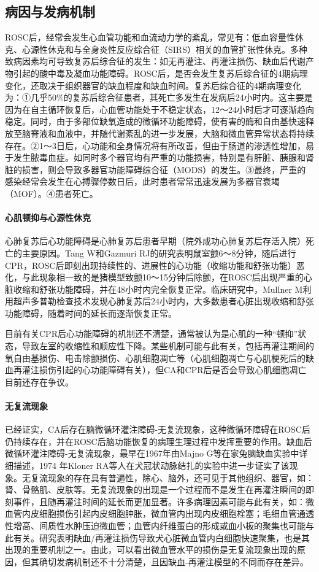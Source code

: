 \subsection{病因与发病机制}

ROSC后，经常会发生心血管功能和血流动力学的紊乱，常见有：低血容量性休克、心源性休克和与全身炎性反应综合征（SIRS）相关的血管扩张性休克。多种致病因素均可导致复苏后综合征的发生：如无再灌注、再灌注损伤、缺血后代谢产物引起的酸中毒及凝血功能障碍。ROSC后，是否会发生复苏后综合征的4期病理变化，还取决于组织器官的缺血程度和缺血时间。复苏后综合征的4期病理变化为：①几乎50\%的复苏后综合征患者，其死亡多发生在发病后24小时内。这主要是因为在自主循环恢复后，心血管功能处于不稳定状态，12～24小时后才可逐渐趋向稳定。同时，由于多部位缺氧造成的微循环功能障碍，使有害的酶和自由基快速释放至脑脊液和血液中，并随代谢紊乱的进一步发展，大脑和微血管异常状态将持续存在。②1～3日后，心功能和全身情况将有所改善，但由于肠道的渗透性增加，易于发生脓毒血症。如同时多个器官均有严重的功能损害，特别是有肝脏、胰腺和肾脏的损害，则会导致多器官功能障碍综合征（MODS）的发生。③最终，严重的感染经常会发生在心搏骤停数日后，此时患者常常迅速发展为多器官衰竭（MOF）。④患者死亡。

\paragraph{心肌顿抑与心源性休克}

心肺复苏后心功能障碍是心肺复苏后患者早期（院外成功心肺复苏后存活入院）死亡的主要原因。Tang
W和Gazmuri
RJ的研究表明鼠室颤6～8分钟，随后进行CPR，ROSC后即刻出现持续性的、进展性的心功能（收缩功能和舒张功能）恶化，与此现象相一致的是猪模型致颤10～15分钟后除颤，在ROSC后出现严重的心脏收缩和舒张功能障碍，并在48小时内完全恢复正常。临床研究中，Mullner
M利用超声多普勒检查技术发现心肺复苏后24小时内，大多数患者心脏出现收缩和舒张功能障碍，随着时间的延长而逐渐恢复正常。

目前有关CPR后心功能障碍的机制还不清楚，通常被认为是心肌的一种“顿抑”状态，导致左室的收缩性和顺应性下降。某些机制可能与此有关，包括再灌注期间的氧自由基损伤、电击除颤损伤、心肌细胞凋亡等（心肌细胞凋亡与心肌梗死后的缺血再灌注损伤引起的心功能障碍有关），但CA和CPR后是否会导致心肌细胞凋亡目前还存在争议。

\paragraph{无复流现象}

已经证实，CA后存在脑微循环灌注障碍-无复流现象，这种微循环障碍在ROSC后仍持续存在，并在ROSC后脑功能恢复的病理生理过程中发挥重要的作用。缺血后微循环灌注障碍-无复流现象，最早在1967年由Majno
G等在家兔脑缺血实验中详细描述，1974 年Kloner
RA等人在犬冠状动脉结扎的实验中进一步证实了该现象。无复流现象的存在具有普遍性，除心、脑外，还可见于其他组织、器官，如：肾、骨骼肌、皮肤等。无复流现象的出现是一个过程而不是发生在再灌注瞬间的即刻事件，且随再灌注时间的延长而更加显著。许多病理因素可能与此有关，如：微血管内皮细胞损伤引起内皮细胞肿胀，微血管内出现内皮细胞栓塞；毛细血管通透性增高、间质性水肿压迫微血管；血管内纤维蛋白的形成或血小板的聚集也可能与此有关。研究表明缺血/再灌注损伤导致犬心脏微血管内白细胞快速聚集，也是其出现的重要机制之一。由此，可以看出微血管水平的损伤是无复流现象出现的原因，但其确切发病机制还不十分清楚，且因缺血-再灌注模型的不同而存在差异。

